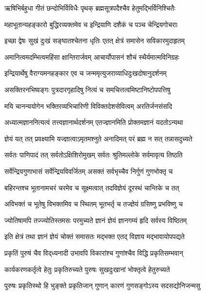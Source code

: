 \twolineshloka
{ऋषिभिर्बहुधा गीतं छन्दोभिर्विविधैः पृथक्}
{ब्रह्मसूत्रपदैश्चैव हेतुमद्भिर्विनिश्चितैः}%

\twolineshloka
{महाभूतान्यहङ्कारो बुद्धिरव्यक्तमेव च}
{इन्द्रियाणि दशैकं च पञ्च चेन्द्रियगोचराः}%

\twolineshloka
{इच्छा द्वेषः सुखं दुःखं सङ्घातश्चेतना धृतिः}
{एतत् क्षेत्रं समासेन सविकारमुदाहृतम्}%

\twolineshloka
{अमानित्वमदम्भित्वमहिंसा क्षान्तिरार्जवम्}
{आचार्योपासनं शौचं स्थैर्यमात्मविनिग्रहः}%

\twolineshloka
{इन्द्रियार्थेषु वैराग्यमनहङ्कार एव च}
{जन्ममृत्युजराव्याधिदुःखदोषानुदर्शनम्}%

\twolineshloka
{असक्तिरनभिष्वङ्गः पुत्रदारगृहादिषु}
{नित्यं च समचित्तत्वमिष्टानिष्टोपपत्तिषु}%

\twolineshloka
{मयि चानन्ययोगेन भक्तिरव्यभिचारिणी}
{विविक्तदेशसेवित्वम् अरतिर्जनसंसदि}%

\twolineshloka
{अध्यात्मज्ञाननित्यत्वं तत्त्वज्ञानार्थदर्शनम्}
{एतज्ज्ञानमिति प्रोक्तमज्ञानं यदतोऽन्यथा}%

\twolineshloka
{ज्ञेयं यत् तत् प्रवक्ष्यामि यज्ज्ञात्वाऽमृतमश्नुते}
{अनादिमत् परं ब्रह्म न सत् तन्नासदुच्यते}%

\twolineshloka
{सर्वतः पाणिपादं तत् सर्वतोऽक्षिशिरोमुखम्}
{सर्वतः श्रुतिमल्लोके सर्वमावृत्य तिष्ठति}%

\twolineshloka
{सर्वेन्द्रियगुणाभासं सर्वेन्द्रियविवर्जितम्}
{असक्तं सर्वभृच्चैव निर्गुणं गुणभोक्तृ च}%

\twolineshloka
{बहिरन्तश्च भूतानामचरं चरमेव च}
{सूक्ष्मत्वात् तदविज्ञेयं दूरस्थं चान्तिके च तत्}%

\twolineshloka
{अविभक्तं च भूतेषु विभक्तमिव च स्थितम्}
{भूतभर्तृ च तज्ज्ञेयं ग्रसिष्णु प्रभविष्णु च}%

\twolineshloka
{ज्योतिषामपि तज्ज्योतिस्तमसः परमुच्यते}
{ज्ञानं ज्ञेयं ज्ञानगम्यं हृदि सर्वस्य विष्ठितम्}%

\twolineshloka
{इति क्षेत्रं तथा ज्ञानं ज्ञेयं चोक्तं समासतः}
{मद्भक्त एतद् विज्ञाय मद्भावायोपपद्यते}%

\twolineshloka
{प्रकृतिं पुरुषं चैव विद्‌ध्यनादी उभावपि}
{विकारांश्च गुणांश्चैव विद्धि प्रकृतिसम्भवान्}%

\twolineshloka
{कार्यकरणकर्तृत्वे हेतुः प्रकृतिरुच्यते}
{पुरुषः सुखदुःखानां भोक्तृत्वे हेतुरुच्यते}%

\twolineshloka
{पुरुषः प्रकृतिस्थो हि भुङ्क्ते प्रकृतिजान् गुणान्}
{कारणं गुणसङ्गोऽस्य सदसद्योनिजन्मसु}%

